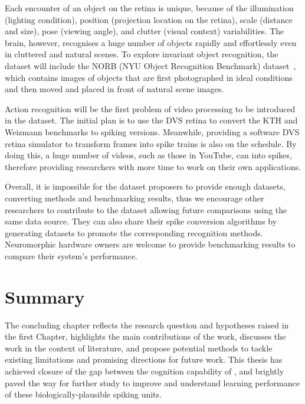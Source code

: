 Each encounter of an object on the retina is unique, because of the illumination (lighting condition), position (projection location on the retina), scale (distance and size), pose (viewing angle), and clutter (visual context) variabilities.
The brain, however, recognises a huge number of objects rapidly and effortlessly even in cluttered and natural scenes.
To explore invariant object recognition, the dataset will include the NORB (NYU Object Recognition Benchmark) dataset~\DIFdelbegin {}\DIFdelend \DIFaddbegin {}\DIFaddend , which contains images of objects that are first photographed in ideal conditions and then moved and placed in front of natural scene images.

Action recognition will be the first problem of video processing to be introduced in the dataset.
The initial plan is to use the DVS retina to convert the KTH and Weizmann benchmarks to spiking versions.
Meanwhile, providing a software DVS retina simulator to transform frames into spike trains is also on the schedule.
By doing this, a huge number of videos, such as those in YouTube, can \DIFdelbegin {}\DIFdelend \DIFaddbegin {}\DIFaddend into spikes, therefore providing researchers with more time to work on their own applications.

Overall, it is impossible for the dataset proposers to provide enough datasets, converting methods and benchmarking results, thus we encourage other researchers to contribute to the dataset allowing future comparisons using the same data source.
They can also share their spike conversion algorithms by generating datasets to promote the corresponding recognition methods.
Neuromorphic hardware owners are welcome to provide benchmarking results to compare their system's performance.
\section{Summary}

The concluding chapter reflects the research question and hypotheses raised in the first Chapter, highlights the main contributions of the work, discusses the work in the context of literature, and propose potential methods to tackle existing limitations and promising directions for future work.
This thesis has achieved closure of the gap between the cognition capability of \DIFdelbegin {}\DIFdelend \DIFaddbegin {}\DIFaddend , and brightly paved the way for further study to improve and understand \DIFaddbegin {}\DIFaddend learning performance of these biologically-plausible spiking units.